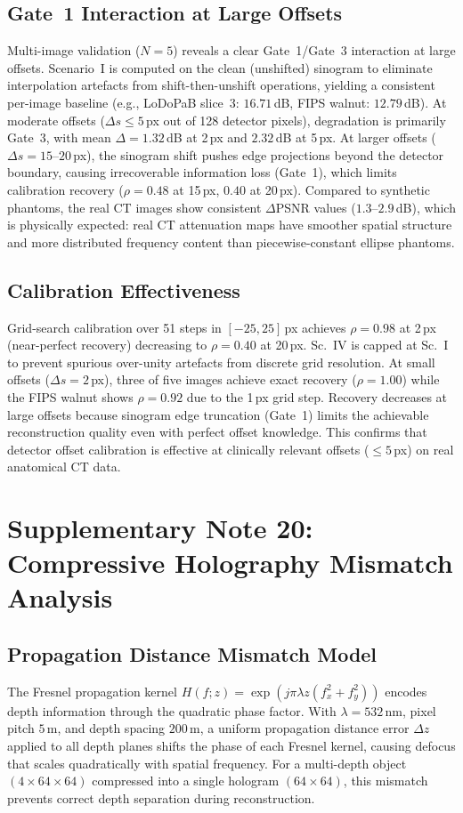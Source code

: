 \documentclass[11pt]{article}
\begin{document}
\subsection{Gate~1 Interaction at Large Offsets}
Multi-image validation ($N{=}5$) reveals a clear Gate~1/Gate~3 interaction at large offsets. Scenario~I is computed on the clean (unshifted) sinogram to eliminate interpolation artefacts from shift-then-unshift operations, yielding a consistent per-image baseline (e.g., LoDoPaB slice~3: $16.71$\,dB, FIPS walnut: $12.79$\,dB). At moderate offsets ($\Delta s \leq 5$\,px out of 128 detector pixels), degradation is primarily Gate~3, with mean $\Delta{=}1.32$\,dB at 2\,px and $2.32$\,dB at 5\,px. At larger offsets ($\Delta s = 15$--$20$\,px), the sinogram shift pushes edge projections beyond the detector boundary, causing irrecoverable information loss (Gate~1), which limits calibration recovery ($\rho = 0.48$ at 15\,px, $0.40$ at 20\,px).
Compared to synthetic phantoms, the real CT images show consistent $\Delta$PSNR values ($1.3$--$2.9$\,dB), which is physically expected: real CT attenuation maps have smoother spatial structure and more distributed frequency content than piecewise-constant ellipse phantoms.

\subsection{Calibration Effectiveness}
Grid-search calibration over 51 steps in $[-25, 25]$\,px achieves $\rho = 0.98$ at 2\,px (near-perfect recovery) decreasing to $\rho = 0.40$ at 20\,px. Sc.~IV is capped at Sc.~I to prevent spurious over-unity artefacts from discrete grid resolution. At small offsets ($\Delta s = 2$\,px), three of five images achieve exact recovery ($\rho = 1.00$) while the FIPS walnut shows $\rho = 0.92$ due to the 1\,px grid step. Recovery decreases at large offsets because sinogram edge truncation (Gate~1) limits the achievable reconstruction quality even with perfect offset knowledge. This confirms that detector offset calibration is effective at clinically relevant offsets ($\leq 5$\,px) on real anatomical CT data.


\section{Supplementary Note 20: Compressive Holography Mismatch Analysis}
\label{sec:note_compholo}

\subsection{Propagation Distance Mismatch Model}
The Fresnel propagation kernel $H(f; z) = \exp(j\pi\lambda z (f_x^2 + f_y^2))$ encodes depth information through the quadratic phase factor. With $\lambda = 532$\,nm, pixel pitch $5$\,\textmu m, and depth spacing $200$\,\textmu m, a uniform propagation distance error $\Delta z$ applied to all depth planes shifts the phase of each Fresnel kernel, causing defocus that scales quadratically with spatial frequency. For a multi-depth object $(4 \times 64 \times 64)$ compressed into a single hologram $(64 \times 64)$, this mismatch prevents correct depth separation during reconstruction.
\end{document}
